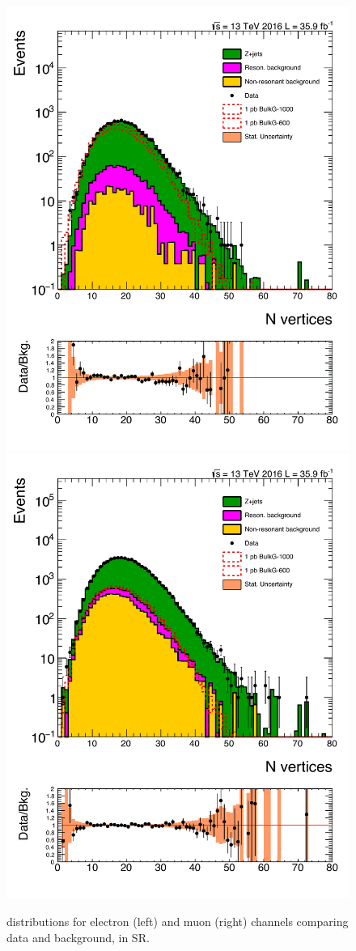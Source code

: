 \begin{figure}[htbp!]
\centering
\includegraphics[width=0.46\linewidth,page=18]{figures/ReMiniSummer16_DT_PhReMiniMCRcFixXsec_GMCPhPtWt_SRdPhiGT0p5_puWeightsummer16_muoneg_gjet_metfilter_unblind_el_log_1pb.pdf}
\includegraphics[width=0.46\linewidth,page=18]{figures/ReMiniSummer16_DT_PhReMiniMCRcFixXsec_GMCPhPtWt_SRdPhiGT0p5_puWeightsummer16_muoneg_gjet_metfilter_unblind_mu_log_1pb.pdf}
\caption{\ptmiss distributions for electron (left) and muon (right) channels
comparing data and background, in SR.}
\label{fig:SR_gjet_met_narrow}
\end{figure}

